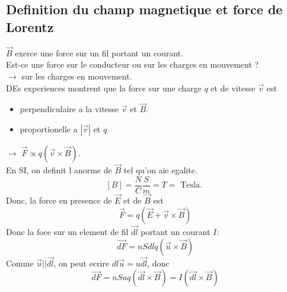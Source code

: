 \documentclass[../main.tex]{subfiles}
\begin{document}
\subsection{Definition du champ magnetique et force de Lorentz}
$\vec{B}$ exerce une force sur un fil portant un courant.\\
Est-ce une force sur le conducteur ou sur les charges en mouvement ?\\
$\to$ sur les charges en mouvement.\\
DEs experiences montrent que la force sur une charge $q$ et de vitesse $\vec{v}$ est
\begin{itemize}
\item perpendiculaire a la vitesse $\vec{v}$ et $\vec{B}$.
\item proportionelle a $|\vec{v}|$ et $q$
\end{itemize}
$\to $ $\vec{F}\propto q ( \vec{v}\times \vec{B}) $.\\
En SI,  on definit l anorme de $\vec{B}$ tel qu'on aie egalite.\\
\[ 
[ B] = \frac{N}{C} \frac{S}{m}= T = \text{ Tesla. } 
\]
Donc, la force en presence de $\vec{E}$ et de $\vec{B}$ est
\[ 
	\vec{F}= q ( \vec{E} + \vec{v}\times \vec{B}) 
\]
Donc la foce sur un element de fil $\vec{dl}$ portant un courant $I:$ 
\[ 
	\vec{dF}= nS dl q ( \vec{u}\times \vec{B}) 
\]
Comme $\vec{u} || \vec{dl}$, on peut ecrire $dl \vec{u}=u \vec{dl}$, donc
\[ 
	\vec{dF}= n Suq ( \vec{dl}\times \vec{B}) =I ( \vec{dl}\times \vec{B}) 
\]
\end{document}
